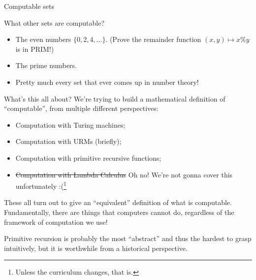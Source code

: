 \documentclass{beamer}
\begin{document}
\begin{frame}{Computable sets}

What other sets are computable?
\begin{itemize}
    \item The even numbers $\{0, 2, 4, \ldots\}$. (Prove the remainder function $(x, y) \mapsto x \% y$ is in PRIM!)
    \item The prime numbers.
    \item Pretty much every set that ever comes up in number theory!
\end{itemize}
\end{frame}


\begin{frame}{What's this all about?}
We're trying to build a mathematical definition of ``computable'', from multiple different perspectives:
\begin{itemize}
    \item Computation with Turing machines; \pause
    \item Computation with URMs (briefly); \pause
    \item Computation with primitive recursive functions; \pause
    \item \sout{Computation with Lambda Calculus} Oh no! We're not gonna cover this unfortunately :(\footnote{Unless the curriculum changes, that is.}\pause
\end{itemize}
These all turn out to give an ``equivalent'' definition of what is computable. Fundamentally, there are things that computers cannot do, regardless of the framework of computation we use!


Primitive recursion is probably the most ``abstract'' and thus the hardest to grasp intuitively, but it is worthwhile from a historical perspective.
\end{frame}
\end{document}
